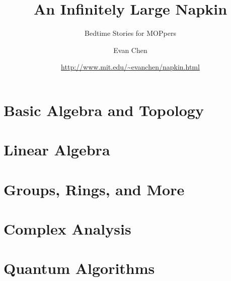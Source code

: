 \documentclass[11pt,numbers=noenddot]{scrreprt}
\begin{document}
\doparttoc[n]

\title{An Infinitely Large Napkin}
\subtitle{Bedtime Stories for MOPpers}
\author{Evan Chen}
\date{\url{http://www.mit.edu/~evanchen/napkin.html}}
\maketitle




\tableofcontents


\part{Basic Algebra and Topology}






\part{Linear Algebra}


\part{Groups, Rings, and More}





\part{Complex Analysis}



%



\part{Quantum Algorithms}



\end{document}
